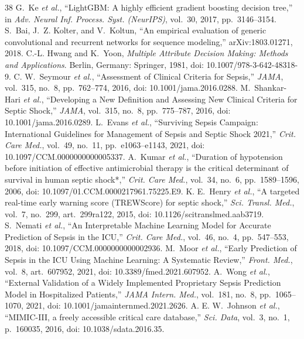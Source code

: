 \documentclass[preprint,12pt]{elsarticle}
\begin{document}
\begin{thebibliography}{38}
 G.~Ke \textit{et al.}, ``LightGBM: A highly efficient gradient boosting decision tree,'' in \textit{Adv. Neural Inf. Process. Syst. (NeurIPS)}, vol.~30, 2017, pp.~3146--3154.
 S.~Bai, J.~Z. Kolter, and V.~Koltun, ``An empirical evaluation of generic convolutional and recurrent networks for sequence modeling,'' arXiv:1803.01271, 2018.
 C.-L. Hwang and K.~Yoon, \textit{Multiple Attribute Decision Making: Methods and Applications}. Berlin, Germany: Springer, 1981, doi: 10.1007/978-3-642-48318-9.
 C. W.~Seymour \textit{et al.}, ``Assessment of Clinical Criteria for Sepsis,'' \textit{JAMA}, vol.~315, no.~8, pp.~762--774, 2016, doi: 10.1001/jama.2016.0288.
 M.~Shankar-Hari \textit{et al.}, ``Developing a New Definition and Assessing New Clinical Criteria for Septic Shock,'' \textit{JAMA}, vol.~315, no.~8, pp.~775--787, 2016, doi: 10.1001/jama.2016.0289.
 L.~Evans \textit{et al.}, ``Surviving Sepsis Campaign: International Guidelines for Management of Sepsis and Septic Shock 2021,'' \textit{Crit. Care Med.}, vol.~49, no.~11, pp.~e1063--e1143, 2021, doi: 10.1097/CCM.0000000000005337.
 A.~Kumar \textit{et al.}, ``Duration of hypotension before initiation of effective antimicrobial therapy is the critical determinant of survival in human septic shock*,'' \textit{Crit. Care Med.}, vol.~34, no.~6, pp.~1589--1596, 2006, doi: 10.1097/01.CCM.0000217961.75225.E9.
 K. E.~Henry \textit{et al.}, ``A targeted real-time early warning score (TREWScore) for septic shock,'' \textit{Sci. Transl. Med.}, vol.~7, no.~299, art.~299ra122, 2015, doi: 10.1126/scitranslmed.aab3719.
 S.~Nemati \textit{et al.}, ``An Interpretable Machine Learning Model for Accurate Prediction of Sepsis in the ICU,'' \textit{Crit. Care Med.}, vol.~46, no.~4, pp.~547--553, 2018, doi: 10.1097/CCM.0000000000002936.
 M.~Moor \textit{et al.}, ``Early Prediction of Sepsis in the ICU Using Machine Learning: A Systematic Review,'' \textit{Front. Med.}, vol.~8, art.~607952, 2021, doi: 10.3389/fmed.2021.607952.
 A.~Wong \textit{et al.}, ``External Validation of a Widely Implemented Proprietary Sepsis Prediction Model in Hospitalized Patients,'' \textit{JAMA Intern. Med.}, vol.~181, no.~8, pp.~1065--1070, 2021, doi: 10.1001/jamainternmed.2021.2626.
 A. E. W.~Johnson \textit{et al.}, ``MIMIC-III, a freely accessible critical care database,'' \textit{Sci. Data}, vol.~3, no.~1, p.~160035, 2016, doi: 10.1038/sdata.2016.35.

\end{thebibliography}
\end{document}
